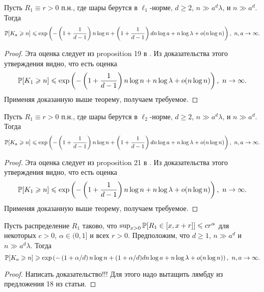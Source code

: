 \begin{cor}
Пусть $R_1\equiv r > 0$ п.н., где шары берутся в $\ell_1$-норме, $d\geq 2$, $n \gg a^d\lambda$, и $n\gg a^d$. 
Тогда $$\mathbb{P}[K_a \geqslant n] \leqslant \exp \left(-\left(1+\dfrac{1}{d-1}\right)n\log n + \left(1+\dfrac{1}{d-1}\right)dn\log a  +n\log\lambda + o(n\log n)\right),\  n, a\to \infty.$$
\end{cor}{}

\begin{proof}
    Эта оценка следует из proposition 19 в \cite{AL}. Из доказательства этого утверждения видно, что есть оценка 
    $$\mathbb{P}[K_1 \geqslant n] \leqslant \exp \left(-\left(1+\dfrac{1}{d-1}\right)n\log n   +n\log\lambda + o(n\log n)\right),\  n \to \infty.$$ Применяя доказанную выше теорему, получаем требуемое.
\end{proof}{}

\begin{cor}
Пусть $R_1\equiv r > 0$ п.н., где шары берутся в $\ell_2$-норме, $d\geq 2$, $n \gg a^d\lambda$, и $n\gg a^d$. 
Тогда $$\mathbb{P}[K_a \geqslant n] \leqslant \exp \left(-\left(1+\dfrac{1}{d-1}\right)n\log n + \left(1+\dfrac{1}{d-1}\right)dn\log a  +n\log\lambda + o(n\log n)\right),\  n, a\to \infty.$$
\end{cor}{}

\begin{proof}
    Эта оценка следует из proposition 21 в \cite{AL}. Из доказательства этого утверждения видно, что есть оценка 
    $$\mathbb{P}[K_1 \geqslant n] \leqslant \exp \left(-\left(1+\dfrac{1}{d-1}\right)n\log n   +n\log\lambda + o(n\log n)\right),\  n \to \infty.$$ Применяя доказанную выше теорему, получаем требуемое.
\end{proof}{}

\begin{cor}
Пусть распределение $R_1$ таково, что $\sup_{x>0}\mathbb{P}[R_1\in [x, x+r]]\leqslant cr^\alpha$ для некоторых $c>0$, $\alpha\in(0, 1]$ и всех $r>0$. Предположим, что $d \geq 1$, $n\gg a^d$ и $n \gg a^d\lambda$.
Тогда $$\mathbb{P}[K_a \geqslant n] \geqslant \exp\left(-\left(1 + \alpha/d\right)n\log n + (1 + \alpha/d)dn\log a + n\log \lambda + o(n\log n)\right), \ n, a \to \infty.$$
\end{cor}{}

\begin{proof}
    Написать доказательство!!! Для этого надо вытащить лямбду из предложения 18 из статьи.
\end{proof}